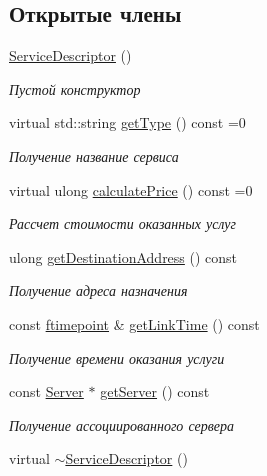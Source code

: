 \subsection*{Открытые члены}
\begin{DoxyCompactItemize}
\item 
\hyperlink{class_network_service_1_1_service_descriptor_a18e78e84c574141558bf4bf4ca2dc8a2}{Service\+Descriptor} ()
\begin{DoxyCompactList}\small\item\em Пустой конструктор \end{DoxyCompactList}\item 
virtual std\+::string \hyperlink{class_network_service_1_1_service_descriptor_ac09d5d704a67a7ab2df6d925751ee5cc}{get\+Type} () const =0
\begin{DoxyCompactList}\small\item\em Получение название сервиса \end{DoxyCompactList}\item 
virtual ulong \hyperlink{class_network_service_1_1_service_descriptor_aa2da86b27ac53d8acb1eddf3723a1e44}{calculate\+Price} () const =0
\begin{DoxyCompactList}\small\item\em Рассчет стоимости оказанных услуг \end{DoxyCompactList}\item 
ulong \hyperlink{class_network_service_1_1_service_descriptor_a3717f7dc804127c03d19592e26d7cb9c}{get\+Destination\+Address} () const 
\begin{DoxyCompactList}\small\item\em Получение адреса назначения \end{DoxyCompactList}\item 
const \hyperlink{networkservice_8h_ac877dfabb0f4f6a8184aa821b447e81d}{ftimepoint} \& \hyperlink{class_network_service_1_1_service_descriptor_a0b854ff7100ce01e7f34ca19299bea35}{get\+Link\+Time} () const 
\begin{DoxyCompactList}\small\item\em Получение времени оказания услуги \end{DoxyCompactList}\item 
const \hyperlink{class_network_service_1_1_server}{Server} $\ast$ \hyperlink{class_network_service_1_1_service_descriptor_aeea7b729a1d6dd25fa3fdedd59d3a050}{get\+Server} () const 
\begin{DoxyCompactList}\small\item\em Получение ассоциированного сервера \end{DoxyCompactList}\item 
virtual \hyperlink{class_network_service_1_1_service_descriptor_a4952af79d52c368095a9ef0b1f2600c1}{$\sim$\+Service\+Descriptor} ()
\end{DoxyCompactItemize}

